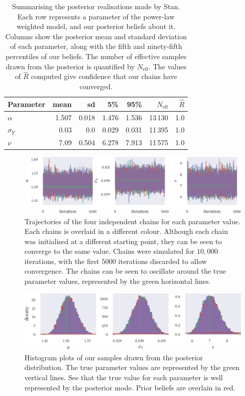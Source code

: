\begin{table}[p]
  \begin{tabular}{@{}lrrrrrr@{}}
    \toprule
    Parameter    & mean  & sd    & 5\%   & 95\%  & $N_{\textrm{eff}}$ & $\hat{R}$ \\
    \midrule
    $\alpha$     & 1.507 & 0.018 & 1.476 & 1.536 & 13\,130            & 1.0       \\
    $\sigma_{Y}$ & 0.03  & 0.0   & 0.029 & 0.031 & 11\,395            & 1.0       \\
    $\nu$        & 7.09  & 0.504 & 6.278 & 7.913 & 11\,575            & 1.0       \\
    \bottomrule
  \end{tabular}
  \caption{Summarising the posterior realisations made by Stan. Each row represents a
      parameter of the power-law weighted model, and our posterior beliefs about it.
      Columns show the posterior mean and standard deviation of each parameter, along with
      the fifth and ninety-fifth percentiles of our beliefs. The number of effective
      samples drawn from the posterior is quantified by $N_{\textrm{eff}}$. The values of
      $\hat{R}$ computed give confidence that our chains have converged.}
  \label{tab:power_sim_study_summary}
\end{table}
\begin{figure}[p]
  \includegraphics{stan_power_trace.pdf}
  \caption{Trajectories of the four independent chains for each parameter value. Each 
  chains is overlaid in a different colour. Although each chain was initialised at a
  different starting point, they can be seen to converge to the same value. Chains were
  simulated for $10,000$ iterations, with the first $5000$ iterations discarded to allow
  convergence. The chains can be seen to oscillate around the true parameter values,
  represented by the green horizontal lines.}
  \label{fig:power_sim_study_chains}
\end{figure}
\begin{figure}[p]
  \includegraphics{stan_power_hist.pdf}
  \caption{Histogram plots of our samples drawn from the posterior distribution. The true
  parameter values are represented by the green vertical lines. See that the true value
  for each parameter is well represented by the posterior mode. Prior beliefs are overlain
  in red.}
  \label{fig:power_sim_study_hists}
\end{figure}

